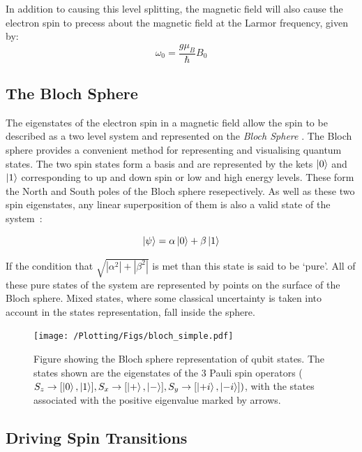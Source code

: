 In addition to causing this level splitting, the magnetic field will also cause the electron spin to precess about the magnetic field at the Larmor frequency, given by:
\begin{equation}
  \omega_0 = \frac{g \mu_B}{\hbar}B_0
\end{equation}

\subsection{The Bloch Sphere}
\label{seq:blochSphere}

The eigenstates of the electron spin in a magnetic field allow the spin to be described as a two level system and represented on the \emph{Bloch Sphere} \cite{Bloch1946,Schweiger}. The Bloch sphere provides a convenient method for representing and visualising quantum states. The two spin states form a basis and are represented by the kets $\ket{0}$ and $\ket{1}$ corresponding to up and down spin or low and high energy levels. These form the North and South poles of the Bloch sphere resepectively. As well as these two spin eigenstates, any linear superposition of them is also a valid state of the system~\cite{Nielsen:2011:QCQ:1972505}:

\begin{equation}
  \ket{\psi} = \alpha\ket{0} + \beta\ket{1}
\end{equation}

If the condition that $\sqrt{|\alpha^2| + |\beta^2|}$ is met than this state is said to be `pure'. All of these pure states of the system are represented by points on the surface of the Bloch sphere. Mixed states, where some classical uncertainty is taken into account in the states representation, fall inside the sphere.

\begin{figure}
  \centering
  \texttt{[image: /Plotting/Figs/bloch\_simple.pdf]}
  \caption[The Bloch sphere and Pauli operator eigenstates]{Figure showing the Bloch sphere representation of qubit states. The states shown are the eigenstates of the 3 Pauli spin operators ($S_z \rightarrow [\ket{0}, \ket{1}], S_x \rightarrow [\ket{+}, \ket{-}], S_y \rightarrow [\ket{+i}, \ket{-i}])$, with the states associated with the positive eigenvalue marked by arrows.}
  \label{fig:bloch_simple}
\end{figure}

\subsection{Driving Spin Transitions}


